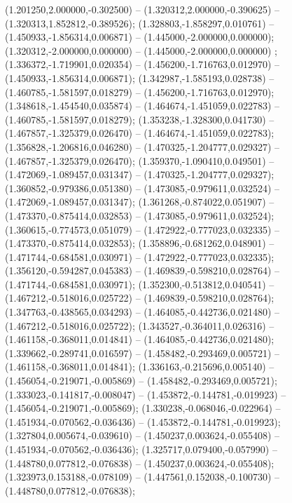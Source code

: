  (1.201250,2.000000,-0.302500) -- (1.320312,2.000000,-0.390625) -- (1.320313,1.852812,-0.389526);
 (1.328803,-1.858297,0.010761) -- (1.450933,-1.856314,0.006871) -- (1.445000,-2.000000,0.000000);
 (1.320312,-2.000000,0.000000) -- (1.445000,-2.000000,0.000000) ;
 (1.336372,-1.719901,0.020354) -- (1.456200,-1.716763,0.012970) -- (1.450933,-1.856314,0.006871);
 (1.342987,-1.585193,0.028738) -- (1.460785,-1.581597,0.018279) -- (1.456200,-1.716763,0.012970);
 (1.348618,-1.454540,0.035874) -- (1.464674,-1.451059,0.022783) -- (1.460785,-1.581597,0.018279);
 (1.353238,-1.328300,0.041730) -- (1.467857,-1.325379,0.026470) -- (1.464674,-1.451059,0.022783);
 (1.356828,-1.206816,0.046280) -- (1.470325,-1.204777,0.029327) -- (1.467857,-1.325379,0.026470);
 (1.359370,-1.090410,0.049501) -- (1.472069,-1.089457,0.031347) -- (1.470325,-1.204777,0.029327);
 (1.360852,-0.979386,0.051380) -- (1.473085,-0.979611,0.032524) -- (1.472069,-1.089457,0.031347);
 (1.361268,-0.874022,0.051907) -- (1.473370,-0.875414,0.032853) -- (1.473085,-0.979611,0.032524);
 (1.360615,-0.774573,0.051079) -- (1.472922,-0.777023,0.032335) -- (1.473370,-0.875414,0.032853);
 (1.358896,-0.681262,0.048901) -- (1.471744,-0.684581,0.030971) -- (1.472922,-0.777023,0.032335);
 (1.356120,-0.594287,0.045383) -- (1.469839,-0.598210,0.028764) -- (1.471744,-0.684581,0.030971);
 (1.352300,-0.513812,0.040541) -- (1.467212,-0.518016,0.025722) -- (1.469839,-0.598210,0.028764);
 (1.347763,-0.438565,0.034293) -- (1.464085,-0.442736,0.021480) -- (1.467212,-0.518016,0.025722);
 (1.343527,-0.364011,0.026316) -- (1.461158,-0.368011,0.014841) -- (1.464085,-0.442736,0.021480);
 (1.339662,-0.289741,0.016597) -- (1.458482,-0.293469,0.005721) -- (1.461158,-0.368011,0.014841);
 (1.336163,-0.215696,0.005140) -- (1.456054,-0.219071,-0.005869) -- (1.458482,-0.293469,0.005721);
 (1.333023,-0.141817,-0.008047) -- (1.453872,-0.144781,-0.019923) -- (1.456054,-0.219071,-0.005869);
 (1.330238,-0.068046,-0.022964) -- (1.451934,-0.070562,-0.036436) -- (1.453872,-0.144781,-0.019923);
 (1.327804,0.005674,-0.039610) -- (1.450237,0.003624,-0.055408) -- (1.451934,-0.070562,-0.036436);
 (1.325717,0.079400,-0.057990) -- (1.448780,0.077812,-0.076838) -- (1.450237,0.003624,-0.055408);
 (1.323973,0.153188,-0.078109) -- (1.447561,0.152038,-0.100730) -- (1.448780,0.077812,-0.076838);
